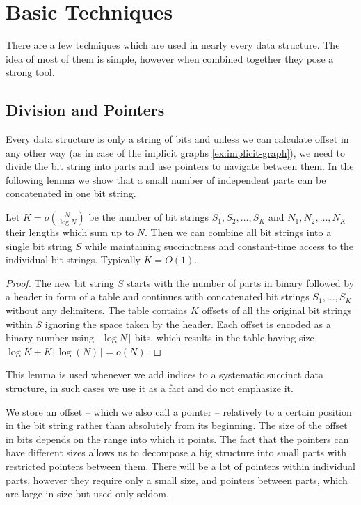 \section{Basic Techniques}

There are a few techniques which are used in nearly every data structure.
The idea of most of them is simple, however when combined together they pose a strong tool.

\subsection{Division and Pointers}

Every data structure is only a string of bits and unless we can calculate offset in any other way (as in case of the implicit graphs \ref{ex:implicit-graph}), we need to divide the bit string into parts and use pointers to navigate between them.
In the following lemma we show that a small number of independent parts can be concatenated in one bit string.

\begin{lemma}\label{l:concat}
	Let $K = o\left(\frac{N}{\log N}\right)$ be the number of bit strings $S_1, S_2, \ldots, S_K$ and $N_1, N_2, \dots, N_K$ their lengths which sum up to $N$.
	Then we can combine all bit strings into a single bit string $S$ while maintaining succinctness and constant-time access to the individual bit strings.
	Typically $K = O(1)$.
\end{lemma}
\begin{proof}
	The new bit string $S$ starts with the number of parts in binary followed by a header in form of a table and continues with concatenated bit strings $S_1, \ldots, S_K$ without any delimiters.
	The table contains $K$ offsets of all the original bit strings within $S$ ignoring the space taken by the header.
	Each offset is encoded as a binary number using $\lceil \log N \rceil$ bits, which results in the table having size $\log K + K \lceil \log (N) \rceil = o(N)$.
\end{proof}

This lemma is used whenever we add indices to a systematic succinct data structure, in such cases we use it as a fact and do not emphasize it.

We store an offset -- which we also call a pointer -- relatively to a certain position in the bit string rather than absolutely from its beginning.
The size of the offset in bits depends on the range into which it points.
The fact that the pointers can have different sizes allows us to decompose a big structure into small parts with restricted pointers between them.
There will be a lot of pointers within individual parts, however they require only a small size, and pointers between parts, which are large in size but used only seldom.

